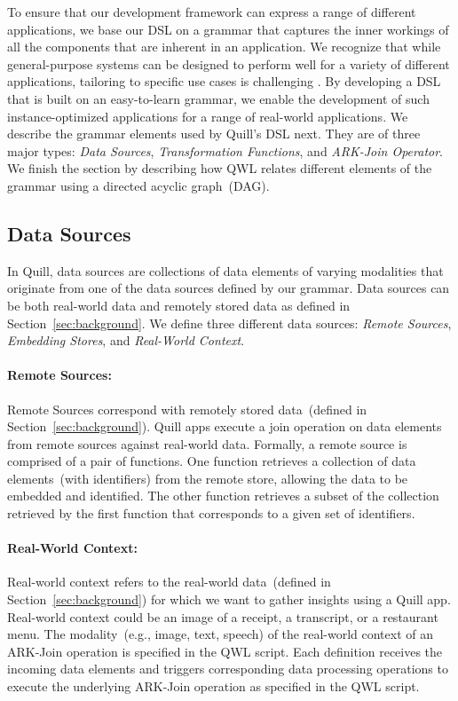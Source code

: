 \documentclass[11pt]{article}
\begin{document}
To ensure that our development framework can express a range of different applications, we base our DSL on a grammar that captures the inner workings of all the components that are inherent in an application. We recognize that while general-purpose systems can be designed to perform well for a variety of different applications, tailoring to specific use cases is challenging \cite{jens}. By developing a DSL that is built on an easy-to-learn grammar, we enable the development of such instance-optimized applications for a range of real-world applications. We describe the grammar elements used by Quill's DSL next. They are of three major types: \textit{Data Sources}, \textit{Transformation Functions}, and \textit{ARK-Join Operator}. We finish the section by describing how QWL relates different elements of the grammar using a directed acyclic graph~(DAG).

\subsection{Data Sources}
In Quill, data sources are collections of data elements of varying modalities that originate from one of the data sources defined by our grammar. Data sources can be both real-world data and remotely stored data as defined in Section~\ref{sec:background}.
We define three different data sources: \emph{Remote Sources}, \emph{Embedding Stores}, and \emph{Real-World Context}.\vspace{0.05cm}

\paragraph{Remote Sources:}
\label{sec:grammar:external}
Remote Sources correspond with remotely stored data~(defined in Section~\ref{sec:background}). Quill apps execute a join operation on data elements from remote sources against real-world data.
Formally, a remote source is comprised of a pair of functions. One function retrieves a collection of data elements~(with identifiers) from the remote store, allowing the data to be embedded and identified.
The other function retrieves a subset of the collection retrieved by the first function that corresponds to a given set of identifiers.\vspace{0.05cm}

\paragraph{Real-World Context:}
Real-world context refers to the real-world data~(defined in Section~\ref{sec:background}) for which we want to gather insights using a Quill app. Real-world context could be an image of a receipt, a transcript, or a restaurant menu. The modality~(e.g., image, text, speech) of the real-world context of an ARK-Join operation is specified in the QWL script. Each definition receives the incoming data elements and triggers corresponding data processing operations to execute the underlying ARK-Join operation as specified in the QWL script.\vspace{0.05cm}
\end{document}
